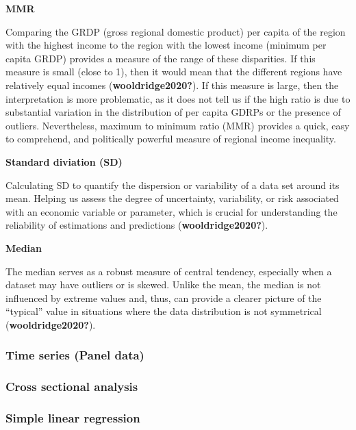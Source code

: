 \documentclass[
  a4paper,
  DIV=11,
  numbers=noendperiod]{scrartcl}
\begin{document}
\textbf{MMR}

Comparing the GRDP (gross regional domestic product) per capita of the
region with the highest income to the region with the lowest income
(minimum per capita GRDP) provides a measure of the range of these
disparities. If this measure is small (close to 1), then it would mean
that the different regions have relatively equal incomes
(\textbf{wooldridge2020?}). If this measure is large, then the
interpretation is more problematic, as it does not tell us if the high
ratio is due to substantial variation in the distribution of per capita
GDRPs or the presence of outliers. Nevertheless, maximum to minimum
ratio (MMR) provides a quick, easy to comprehend, and politically
powerful measure of regional income inequality.

\textbf{Standard diviation (SD)}

Calculating SD to quantify the dispersion or variability of a data set
around its mean. Helping us assess the degree of uncertainty,
variability, or risk associated with an economic variable or parameter,
which is crucial for understanding the reliability of estimations and
predictions (\textbf{wooldridge2020?}).

\textbf{Median}

The median serves as a robust measure of central tendency, especially
when a dataset may have outliers or is skewed. Unlike the mean, the
median is not influenced by extreme values and, thus, can provide a
clearer picture of the ``typical'' value in situations where the data
distribution is not symmetrical (\textbf{wooldridge2020?}).

\hypertarget{time-series-panel-data}{%
\subsubsection{\texorpdfstring{\textbf{Time series (Panel
data)}}{Time series (Panel data)}}\label{time-series-panel-data}}

\hypertarget{cross-sectional-analysis}{%
\subsubsection{Cross sectional
analysis}\label{cross-sectional-analysis}}

\hypertarget{simple-linear-regression}{%
\subsubsection{Simple linear
regression}\label{simple-linear-regression}}
\end{document}

